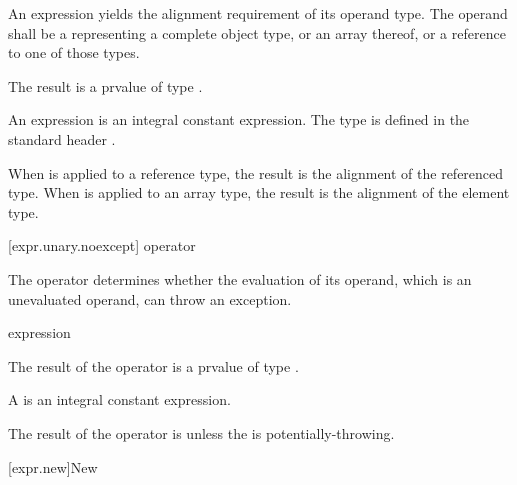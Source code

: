 \pnum
{}%
%
An  expression yields the alignment requirement
of its operand type. The operand shall be a 
representing a complete object type, or an array thereof, or a reference
to one of those types.

\pnum
The result is a prvalue of type .
\begin{note}
An  expression
is an integral constant expression.
The type  is defined in the standard header
.
\end{note}

\pnum
When  is applied to a reference type, the result
is the alignment of the referenced type. When 
is applied to an array type, the result is the alignment of the
element type.

[expr.unary.noexcept]{ operator}

\pnum
{}%
%
The  operator determines whether the evaluation of its operand,
which is an unevaluated operand, can throw an
exception.

\begin{bnf}
\br
   \terminal{(} expression \terminal{)}
\end{bnf}

\pnum
The result of the  operator is a prvalue of type .
\begin{note}
A 
is an integral constant expression.
\end{note}

\pnum
The result of the  operator is 
unless the  is potentially-throwing.

[expr.new]{New}

